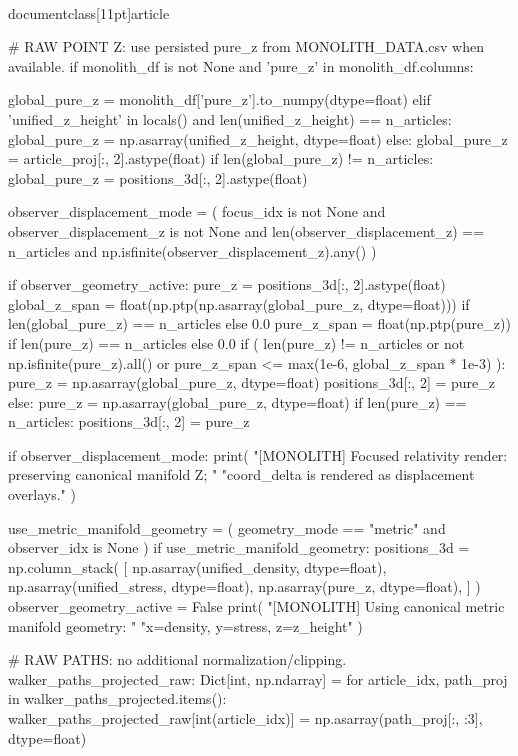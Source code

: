 \\documentclass[11pt]{article}
\begin{document}
\begin{CodeBlock}
{{{{{    # RAW POINT Z: use persisted pure_z from MONOLITH_DATA.csv when available.
    if monolith_df is not None and 'pure_z' in monolith_df.columns:

        global_pure_z = monolith_df['pure_z'].to_numpy(dtype=float)
    elif 'unified_z_height' in locals() and len(unified_z_height) == n_articles:
        global_pure_z = np.asarray(unified_z_height, dtype=float)
    else:
        global_pure_z = article_proj[:, 2].astype(float)
    if len(global_pure_z) != n_articles:
        global_pure_z = positions_3d[:, 2].astype(float)

    observer_displacement_mode = (
        focus_idx is not None
        and observer_displacement_z is not None
        and len(observer_displacement_z) == n_articles
        and np.isfinite(observer_displacement_z).any()
    )

    if observer_geometry_active:
        pure_z = positions_3d[:, 2].astype(float)
        global_z_span = float(np.ptp(np.asarray(global_pure_z, dtype=float))) if len(global_pure_z) == n_articles else 0.0
        pure_z_span = float(np.ptp(pure_z)) if len(pure_z) == n_articles else 0.0
        if (
            len(pure_z) != n_articles
            or not np.isfinite(pure_z).all()
            or pure_z_span <= max(1e-6, global_z_span * 1e-3)
        ):
            pure_z = np.asarray(global_pure_z, dtype=float)
        positions_3d[:, 2] = pure_z
    else:
        pure_z = np.asarray(global_pure_z, dtype=float)
        if len(pure_z) == n_articles:
            positions_3d[:, 2] = pure_z

    if observer_displacement_mode:
        print(
            "[MONOLITH] Focused relativity render: preserving canonical manifold Z; "
            "coord_delta is rendered as displacement overlays."
        )

    use_metric_manifold_geometry = (
        geometry_mode == "metric"
        and observer_idx is None
    )
    if use_metric_manifold_geometry:
        positions_3d = np.column_stack(
            [
                np.asarray(unified_density, dtype=float),
                np.asarray(unified_stress, dtype=float),
                np.asarray(pure_z, dtype=float),
            ]
        )
        observer_geometry_active = False
        print(
            "[MONOLITH] Using canonical metric manifold geometry: "
            "x=density, y=stress, z=z_height"
        )

    # RAW PATHS: no additional normalization/clipping.
    walker_paths_projected_raw: Dict[int, np.ndarray] = {}
    for article_idx, path_proj in walker_paths_projected.items():
        walker_paths_projected_raw[int(article_idx)] = np.asarray(path_proj[:, :3], dtype=float)

}}}}}
\end{CodeBlock}
\end{document}
